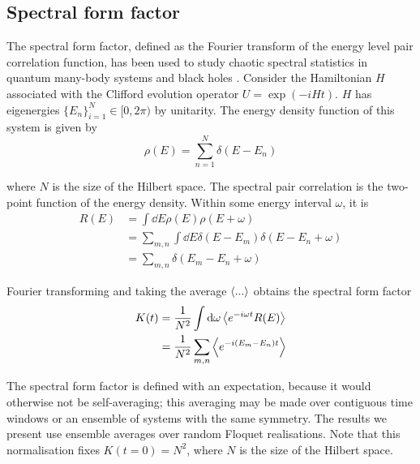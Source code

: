 \documentclass[10pt]{article}
\begin{document}





\subsection{Spectral form factor}


The spectral form factor, defined as the Fourier transform of the energy level pair correlation function, has been used to study chaotic spectral statistics in quantum many-body systems and black holes \cite{bertini2018exact, gharibyan2018onset, cotler2017black}. Consider the Hamiltonian $H$ associated with the Clifford evolution operator $U=\exp(-iHt)$. $H$ has eigenergies $\{E_n\}_{i=1}^N \in [0, 2\pi)$ by unitarity. The energy density function of this system is given by
\begin{equation}
\rho(E) = \sum_{n=1}^N \delta(E-E_n)
\end{equation}

where $N$ is the size of the Hilbert space. The spectral pair correlation is the two-point function of the energy density. Within some energy interval $\omega$, it is
\begin{align}
R(E) &= \int \dd{E} \rho(E) \rho(E+\omega) \\
&= \sum_{m,n} \int \dd{E} \delta(E-E_m) \delta(E-E_n+\omega) \\
&= \sum_{m,n} \delta(E_m-E_n+\omega) 
\end{align}

Fourier transforming and taking the average $\ev{...}$ obtains the spectral form factor
\begin{align}
K(t) 
&= \frac{1}{N^2} \int \dd{\omega} \ev{ e^{-i\omega t} R(E) } \\
&= \frac{1}{N^2} \sum_{m,n} \ev{ e^{-i(E_m-E_n)t} }
\end{align}

The spectral form factor is defined with an expectation, because it would otherwise not be self-averaging; this averaging may be made over contiguous time windows or an ensemble of systems with the same symmetry. The results we present use ensemble averages over random Floquet realisations. Note that this normalisation fixes $K(t=0) = N^2$, where $N$ is the size of the Hilbert space. 
\end{document}
